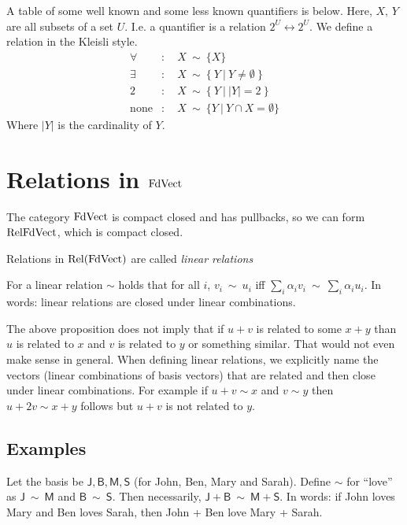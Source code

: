 A table of some well known and
some less known quantifiers is below. Here, $X,\,Y$ are all
subsets of a set $U$. I.e. a quantifier is a relation $2^U
\longleftrightarrow 2^U$. We define a relation in the Kleisli style.
\begin{align*}
\forall &:\quad X ~ \sim ~\{X\}\\
\exists &:\quad X ~ \sim ~ \{~Y ~|~ Y \neq \emptyset
~ \}\\
2 &:\quad X ~\sim ~\{~Y ~|~ |Y| = 2~ \}\\
\mathrm{none} & : \quad X ~ \sim ~ \{Y ~|~ Y \cap X = \emptyset \}
\end{align*}
Where $|Y|$ is the cardinality of $Y$.


\section{Relations in $\mathrm{FdVect}$}
The category $\mathrm{FdVect}$ is compact closed and has pullbacks, so we
can form $\mathrm{Rel}{\mathrm{FdVect}}$, which is compact closed. 

\begin{definition}
Relations in $\mathrm{Rel}(\mathrm{FdVect})$ are called \emph{linear relations}
\end{definition}

\begin{proposition}
For a linear relation $\sim$ holds that for all $i$, $v_i ~\sim~u_i$ iff $\sum_i \alpha_i v_i ~\sim ~ \sum_i
  \alpha_i u_i$. In words: linear relations are closed under linear combinations.
\end{proposition}

\begin{remark}
The above proposition does not imply that if $u + v$ is related
to some $x + y$ than $u$ is related to $x$ and $v$ is related to $y$
or something similar. That would not even make sense in general. When
defining linear relations, we explicitly name the vectors (linear
combinations of basis vectors) that are related and then close
under linear combinations. For example if $u + v  \sim x$ and $v \sim
y$ then $u + 2v \sim x + y$ follows but $u + v$ is not related to $y$.
\end{remark}

\subsection{Examples}
Let the basis be $\mathsf{J}, \mathsf{B}, \mathsf{M}, \mathsf{S}$ (for
John, Ben, Mary and Sarah). Define $\sim$ for ``love'' as $\mathsf{J}
~\sim~\mathsf{M}$ and $\mathsf{B}~\sim~\mathsf{S}$. Then necessarily,
$\mathsf{J} + \mathsf{B} ~\sim~\mathsf{M}+\mathsf{S}$. In words: if
John loves Mary and Ben loves Sarah, then John + Ben love Mary +
Sarah. 


